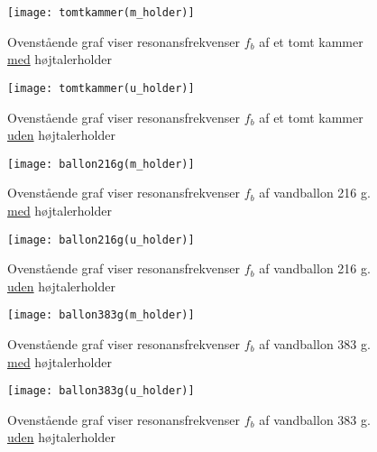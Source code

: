 \begin{figure}[!h]
  \begin{minipage}[b]{1\linewidth}
    \centering
    \texttt{[image: tomtkammer(m\_holder)]}
    \caption{Ovenstående graf viser resonansfrekvenser $f_{b}$ af et tomt kammer \underline{med} højtalerholder}
    \label{fig:tomtkammer(m_holder)}
  \end{minipage}
  \hspace{1cm}
  \begin{minipage}[b]{1\linewidth}
    \centering
    \texttt{[image: tomtkammer(u\_holder)]}
    \caption{Ovenstående graf viser resonansfrekvenser $f_{b}$ af et tomt kammer \underline{uden} højtalerholder}
    \label{fig:tomtkammer(u_holder)}
  \end{minipage}
\end{figure}


\begin{figure}[htbp]
  \begin{minipage}[b]{1\linewidth}
    \centering
    \texttt{[image: ballon216g(m\_holder)]}
    \caption{Ovenstående graf viser resonansfrekvenser $f_{b}$  af vandballon 216 g. \underline{med} højtalerholder}
    \label{fig:ballon216g(m_holder)}
  \end{minipage}
  \hspace{1cm}
  \begin{minipage}[b]{1\linewidth}
    \centering
    \texttt{[image: ballon216g(u\_holder)]}
    \caption{Ovenstående graf viser resonansfrekvenser $f_{b}$  af vandballon 216 g. \underline{uden} højtalerholder}
    \label{fig:ballon216g(u_holder)}
  \end{minipage}
\end{figure}

\begin{figure}[htbp]
  \begin{minipage}[b]{1\linewidth}
    \centering
    \texttt{[image: ballon383g(m\_holder)]}
    \caption{Ovenstående graf viser resonansfrekvenser $f_{b}$  af vandballon 383 g. \underline{med} højtalerholder}
    \label{fig:ballon216g(m_holder)}
    \label{fig:ballon383g(m_holder)}
  \end{minipage}
  \hspace{1cm}
  \begin{minipage}[b]{1\linewidth}
    \centering
    \texttt{[image: ballon383g(u\_holder)]}
    \caption{Ovenstående graf viser resonansfrekvenser $f_{b}$  af vandballon 383 g. \underline{uden} højtalerholder}
    \label{fig:ballon383g(u_holder)}
  \end{minipage}
\end{figure}

